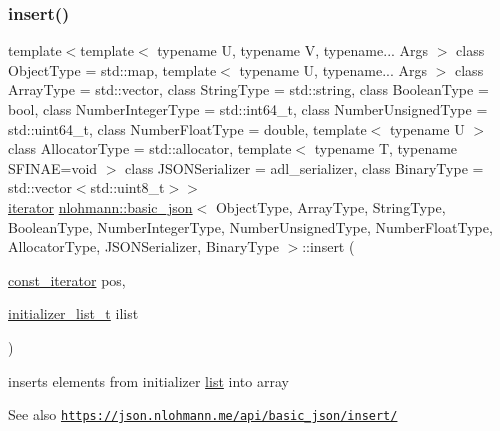 \subsubsection{\texorpdfstring{insert()}{insert()}\hspace{0.1cm}{\footnotesize\ttfamily [5/6]}}
{\footnotesize\ttfamily template$<$template$<$ typename U, typename V, typename... Args $>$ class Object\+Type = std\+::map, template$<$ typename U, typename... Args $>$ class Array\+Type = std\+::vector, class String\+Type  = std\+::string, class Boolean\+Type  = bool, class Number\+Integer\+Type  = std\+::int64\+\_\+t, class Number\+Unsigned\+Type  = std\+::uint64\+\_\+t, class Number\+Float\+Type  = double, template$<$ typename U $>$ class Allocator\+Type = std\+::allocator, template$<$ typename T, typename S\+F\+I\+N\+A\+E=void $>$ class J\+S\+O\+N\+Serializer = adl\+\_\+serializer, class Binary\+Type  = std\+::vector$<$std\+::uint8\+\_\+t$>$$>$ \\
\hyperlink{classnlohmann_1_1basic__json_aa549b2b382916b3baafb526e5cb410bd}{iterator} \hyperlink{classnlohmann_1_1basic__json}{nlohmann\+::basic\+\_\+json}$<$ Object\+Type, Array\+Type, String\+Type, Boolean\+Type, Number\+Integer\+Type, Number\+Unsigned\+Type, Number\+Float\+Type, Allocator\+Type, J\+S\+O\+N\+Serializer, Binary\+Type $>$\+::insert (\begin{DoxyParamCaption}\item[{\hyperlink{classnlohmann_1_1basic__json_aebd2cfa7e4ded4e97cde9269bfeeea38}{const\+\_\+iterator}}]{pos,  }\item[{\hyperlink{classnlohmann_1_1basic__json_ac569f292a070dfd2f6b69c16e746095a}{initializer\+\_\+list\+\_\+t}}]{ilist }\end{DoxyParamCaption})\hspace{0.3cm}{\ttfamily [inline]}}



inserts elements from initializer \hyperlink{protocollist-p}{list} into array 

\begin{DoxySeeAlso}{See also}
\href{https://json.nlohmann.me/api/basic_json/insert/}{\tt https\+://json.\+nlohmann.\+me/api/basic\+\_\+json/insert/} 
\end{DoxySeeAlso}
\mbox{\label{classnlohmann_1_1basic__json_a0181d03c6314bedcbad2e92d3676223c}} 
